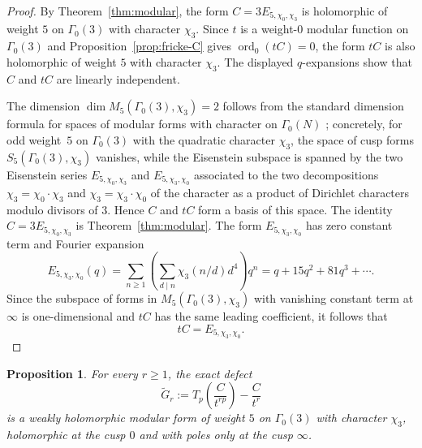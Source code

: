 \documentclass[11pt]{amsart}
\newtheorem{proposition}[theorem]{Proposition}
\theoremstyle{remark}
\DeclareMathOperator{\ord}{ord}
\begin{document}
\begin{proof}
By Theorem~\ref{thm:modular}, the form $C=3E_{5,\chi_0,\chi_3}$ is holomorphic of weight $5$ on
$\Gamma_0(3)$ with character $\chi_3$. Since $t$ is a weight-$0$ modular function on $\Gamma_0(3)$ and
Proposition~\ref{prop:fricke-C} gives $\ord_0(tC)=0$, the form $tC$ is also holomorphic of weight $5$ with
character $\chi_3$. The displayed $q$-expansions show that $C$ and $tC$ are linearly independent.

The dimension $\dim M_5(\Gamma_0(3),\chi_3)=2$ follows from the standard dimension formula for spaces of
modular forms with character on $\Gamma_0(N)$ \cite[\S3.5 and \S3.6]{DS}; concretely, for odd weight~$5$
on $\Gamma_0(3)$ with the quadratic character $\chi_3$, the space of cusp forms $S_5(\Gamma_0(3),\chi_3)$
vanishes, while the Eisenstein subspace is spanned by the two Eisenstein series $E_{5,\chi_0,\chi_3}$ and
$E_{5,\chi_3,\chi_0}$ associated to the two decompositions $\chi_3=\chi_0\cdot\chi_3$ and
$\chi_3=\chi_3\cdot\chi_0$ of the character as a product of Dirichlet characters modulo divisors of $3$.
Hence $C$ and $tC$ form a basis of this space.
The identity $C=3E_{5,\chi_0,\chi_3}$ is
Theorem~\ref{thm:modular}. The form $E_{5,\chi_3,\chi_0}$ has zero constant term and Fourier expansion
\[
E_{5,\chi_3,\chi_0}(q)
=
\sum_{n\ge1}\left(\sum_{d\mid n}\chi_3(n/d)d^4\right)q^n
=
q+15q^2+81q^3+\cdots.
\]
Since the subspace of forms in $M_5(\Gamma_0(3),\chi_3)$ with vanishing constant term at $\infty$ is
one-dimensional and $tC$ has the same leading coefficient, it follows that
\[
tC=E_{5,\chi_3,\chi_0}.
\]
\end{proof}

\begin{proposition}\label{prop:defect-only-infty}
For every $r\ge1$, the exact defect
\[
\widetilde G_r:=T_p\!\left(\frac{C}{t^{rp}}\right)-\frac{C}{t^r}
\]
is a weakly holomorphic modular form of weight $5$ on $\Gamma_0(3)$ with character $\chi_3$,
holomorphic at the cusp $0$ and with poles only at the cusp $\infty$.
\end{proposition}
\end{document}
